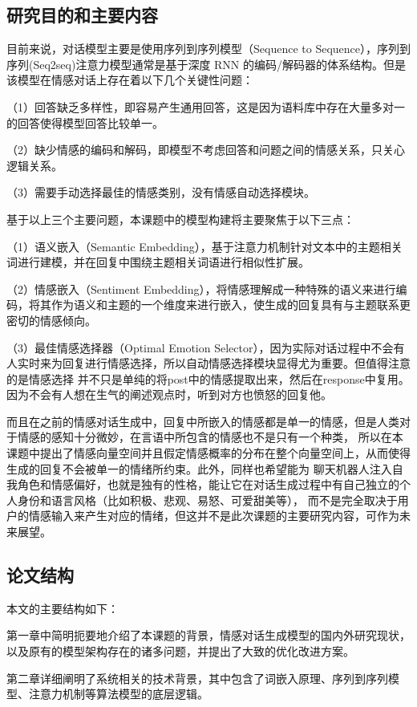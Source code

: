 \documentclass[supercite]{HustGraduPaper}
\theoremstyle{definition}
\begin{document}
\subsection{研究目的和主要内容}
目前来说，对话模型主要是使用序列到序列模型（Sequence to Sequence），序列到序列(Seq2seq)注意力模型通常是基于深度 RNN 的编码/解码器的体系结构。但是该模型在情感对话上存在着以下几个关键性问题：

（1）回答缺乏多样性，即容易产生通用回答，这是因为语料库中存在大量多对一的回答使得模型回答比较单一。

（2）缺少情感的编码和解码，即模型不考虑回答和问题之间的情感关系，只关心逻辑关系。

（3）需要手动选择最佳的情感类别，没有情感自动选择模块。

基于以上三个主要问题，本课题中的模型构建将主要聚焦于以下三点：

（1）语义嵌入（Semantic Embedding），基于注意力机制针对文本中的主题相关词进行建模，并在回复中围绕主题相关词语进行相似性扩展。

（2）情感嵌入（Sentiment Embedding），将情感理解成一种特殊的语义来进行编码，将其作为语义和主题的一个维度来进行嵌入，使生成的回复具有与主题联系更密切的情感倾向。

（3）最佳情感选择器（Optimal Emotion Selector），因为实际对话过程中不会有人实时来为回复进行情感选择，所以自动情感选择模块显得尤为重要。但值得注意的是情感选择
并不只是单纯的将post中的情感提取出来，然后在response中复用。因为不会有人想在生气的阐述观点时，听到对方也愤怒的回复他。

而且在之前的情感对话生成中，回复中所嵌入的情感都是单一的情感，但是人类对于情感的感知十分微妙，在言语中所包含的情感也不是只有一个种类，
所以在本课题中提出了情感向量空间并且假定情感概率的分布在整个向量空间上，从而使得生成的回复不会被单一的情绪所约束。此外，同样也希望能为
聊天机器人注入自我角色和情感偏好，也就是独有的性格，能让它在对话生成过程中有自己独立的个人身份和语言风格（比如积极、悲观、易怒、可爱甜美等），
而不是完全取决于用户的情感输入来产生对应的情绪，但这并不是此次课题的主要研究内容，可作为未来展望。




\subsection{论文结构}
本文的主要结构如下：

第一章中简明扼要地介绍了本课题的背景，情感对话生成模型的国内外研究现状，以及原有的模型架构存在的诸多问题，并提出了大致的优化改进方案。

第二章详细阐明了系统相关的技术背景，其中包含了词嵌入原理、序列到序列模型、注意力机制等算法模型的底层逻辑。
\end{document}
